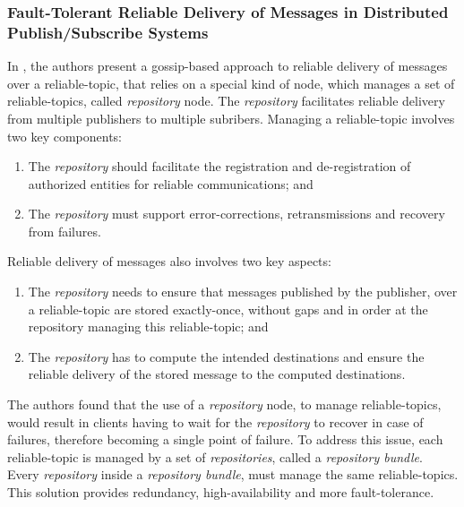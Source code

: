 \subsubsection{Fault-Tolerant Reliable Delivery of Messages in Distributed Publish/Subscribe Systems}
\label{sec:fault_tolerant_reliable_delivery}

In \cite{repository-nodes}, the authors present a gossip-based approach to reliable delivery of messages over a reliable-topic, that relies on a special kind of node, which manages a set of reliable-topics, called \textit{repository} node. The \textit{repository} facilitates reliable delivery from multiple publishers to multiple subribers. Managing a reliable-topic involves two key components:
\begin{enumerate}
  \item The \textit{repository} should facilitate the registration and de-registration of authorized entities for reliable communications; and
  \item The \textit{repository} must support error-corrections, retransmissions and recovery from failures.
\end{enumerate}

Reliable delivery of messages also involves two key aspects:
\begin{enumerate}
  \item The \textit{repository} needs to ensure that messages published by the publisher, over a reliable-topic are stored exactly-once, without gaps and in order at the repository managing this reliable-topic; and
  \item The \textit{repository} has to compute the intended destinations and ensure the reliable delivery of the stored message to the computed destinations.
\end{enumerate}

The authors found that the use of a \textit{repository} node, to manage reliable-topics, would result in clients having to wait for the \textit{repository} to recover in case of failures, therefore becoming a single point of failure. To address this issue, each reliable-topic is managed by a set of \textit{repositories}, called a \textit{repository bundle}. Every \textit{repository} inside a \textit{repository bundle}, must manage the same reliable-topics. This solution provides redundancy, high-availability and more fault-tolerance.

